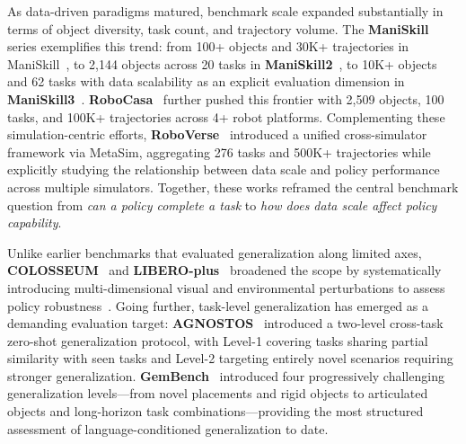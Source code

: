 As data-driven paradigms matured, benchmark scale expanded substantially in terms of object diversity, task count, and trajectory volume. The \textbf{ManiSkill} series exemplifies this trend: from 100+ objects and 30K+ trajectories in ManiSkill~\cite{mu2021maniskill}, to 2,144 objects across 20 tasks in \textbf{ManiSkill2}~\cite{ManiSkill2}, to 10K+ objects and 62 tasks with data scalability as an explicit evaluation dimension in \textbf{ManiSkill3}~\cite{tao2024maniskill3}. \textbf{RoboCasa}~\cite{RoboCasa} further pushed this frontier with 2,509 objects, 100 tasks, and 100K+ trajectories across 4+ robot platforms. Complementing these simulation-centric efforts, \textbf{RoboVerse}~\cite{geng2025roboverse} introduced a unified cross-simulator framework via MetaSim, aggregating 276 tasks and 500K+ trajectories while explicitly studying the relationship between data scale and policy performance across multiple simulators. Together, these works reframed the central benchmark question from \textit{can a policy complete a task} to \textit{how does data scale affect policy capability}.

Unlike earlier benchmarks that evaluated generalization along limited axes, \textbf{COLOSSEUM}~\cite{pumacay2024colosseum} and \textbf{LIBERO-plus}~\cite{fei2025liberoplus} broadened the scope by systematically introducing multi-dimensional visual and environmental perturbations to assess policy robustness~\cite{zhou2025liberopro, wang2026liberox}. Going further, task-level generalization has emerged as a demanding evaluation target: \textbf{AGNOSTOS}~\cite{zhou2025agnostos} introduced a two-level cross-task zero-shot generalization protocol, with Level-1 covering tasks sharing partial similarity with seen tasks and Level-2 targeting entirely novel scenarios requiring stronger generalization. \textbf{GemBench}~\cite{garcia2025gembench} introduced four progressively challenging generalization levels—from novel placements and rigid objects to articulated objects and long-horizon task combinations—providing the most structured assessment of language-conditioned generalization to date.

